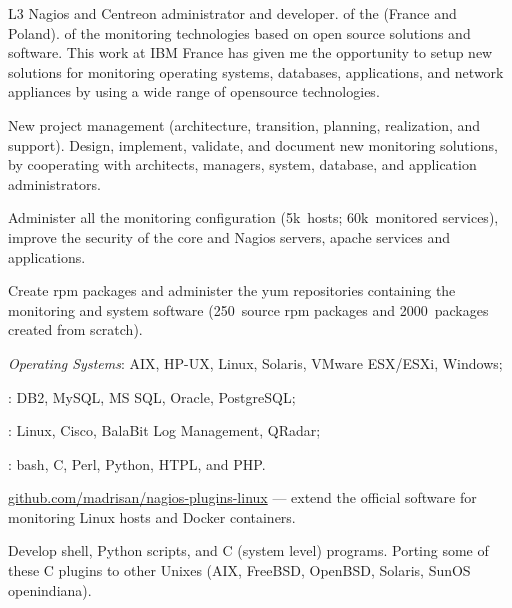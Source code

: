 L3 Nagios and Centreon administrator and developer.
 of the 
(France and Poland).
 of the monitoring technologies based on open source
solutions and software.
This work at IBM France has given me the opportunity to setup new solutions 
for monitoring operating systems, databases, applications, and network 
appliances by using a wide range of opensource technologies.

\smallskip\noindent
\tasks
New project management
(architecture, transition, planning, realization, and support).
Design, implement, validate, and document new monitoring solutions,
by cooperating with architects, managers, system, database, and application 
administrators.

\tinyskip
Administer all the monitoring configuration
(5k\smallplus~hosts; 60k\smallplus~monitored services), improve the security
of the core and Nagios servers, apache services and applications.

\tinyskip
Create rpm packages and administer the yum repositories containing
the monitoring and system software (250\smallplus~source rpm packages and
2000~packages created from scratch).

\tinyskip\noindent
\technologies
{\it Operating Systems\/}:
AIX, HP-UX, Linux, Solaris, VMware ESX/ESXi, Windows;
\par{}: DB2, MySQL, MS SQL, Oracle, PostgreSQL;
\par{}: Linux, Cisco,
BalaBit Log Management, QRadar;
\par{}: bash, C, Perl, Python, HTPL, and PHP.

\smallskip\noindent
\software
\url{github.com/madrisan/nagios-plugins-linux} ---
extend the  official software for monitoring Linux
hosts and Docker containers.

Develop shell, Python scripts, and C (system level) programs.
Porting some of these C plugins to other Unixes 
(AIX, FreeBSD, OpenBSD, Solaris, SunOS openindiana).


